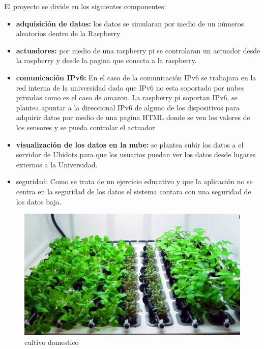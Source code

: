 \documentclass[10pt]{article}\usepackage[]{graphicx}\usepackage[]{color}
\begin{document}
	
	El proyecto se divide en los siguientes componentes:
	
	\begin{itemize}
		\item \textbf{adquisición de datos:} los datos se simularan por medio de un números aleatorios dentro de la Raspberry
		\item \textbf{actuadores:} por medio de una raspberry pi se controlaran un actuador desde la raspberry y desde la pagina que conecta a la raspberry.
		
		\item \textbf{comunicación IPv6:} En el caso de la comunicación IPv6 se trabajara en la red interna de la universidad dado que IPv6 no esta soportado por nubes privadas como es el caso de amazon. La  raspberry pi soportan IPv6, se plantea apuntar a la direccional IPv6 de alguno de los dispositivos para  adquirir datos  por medio de una pagina   HTML donde se ven los valores de los sensores y se pueda controlar el actuador 
		\item\textbf{ visualización de los datos en la nube:} se plantea subir los datos a el servidor de Ubidots para que los usuarios puedan ver los datos desde lugares externos a la Universidad.
		\item seguridad: Como se trata de un ejercicio educativo y que la aplicación no se centra en la seguridad de los datos  el sistema contara con una seguridad de los datos baja. 	
	\end{itemize}
	
	
	
	
	
	\begin{figure}[h] %
		\centering
		\includegraphics[scale=0.5]{Elementos}   %
		\caption{cultivo domestico \textbf{} }
	\end{figure}
	
\end{document}
